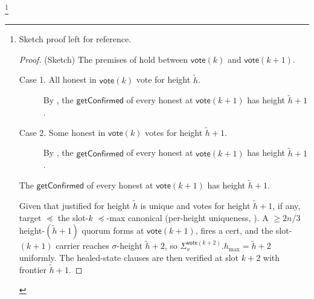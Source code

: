 \ifx\litemode\undefined\documentclass{article}\fi
\newcommand{\hmax}{\ensuremath{h_{\max}}\xspace}
\newcommand{\vote}{\ensuremath{\mathsf{vote}}}
\newcommand{\comm}[1]{\ensuremath{\widetilde{#1}}}
\newcommand{\getConfirmed}{\textsf{getConfirmed}\xspace}
\theoremstyle{plain}
\theoremstyle{definition}
\theoremstyle{remark}
\begin{document}
\iffull
\footnote{
Sketch proof left for reference.
\begin{proof}(Sketch)
The premises of  hold between $\vote(k)$ and $\vote(k+1)$.
\begin{description}
  \item[Case 1. All honest in $\vote(k)$ vote for height $\comm{h}$.]
  By , the $\getConfirmed$ of every honest at $\vote(k+1)$ has height $\comm{h}+1$.

  \item[Case 2. Some honest in $\vote(k)$ votes for height $\comm{h}+1$.]
  By , the $\getConfirmed$ of every honest at $\vote(k+1)$ has height $\comm{h}+1$.
\end{description}
The $\getConfirmed$ of every honest at $\vote(k+1)$ has height $\comm{h}+1$.

Given that justified for height $\comm{h}$ is unique and votes for height $\comm{h}+1$, if any, target $\preceq$ the slot-$k$ $\preceq$-max canonical (per-height uniqueness, ).
A $\geq 2n/3$ height-$(\comm{h}+1)$ quorum forms at $\vote(k+1)$, fires a cert, and the slot-$(k+1)$ carrier reaches $\sigma$-height $\comm{h}+2$, so $\Sigma_v^{\vote(k+2)}.\hmax = \comm{h}+2$ uniformly.
The healed-state clauses are then verified at slot $k+2$ with frontier $\comm{h}+1$.
\end{proof}}
\fi
\end{document}

